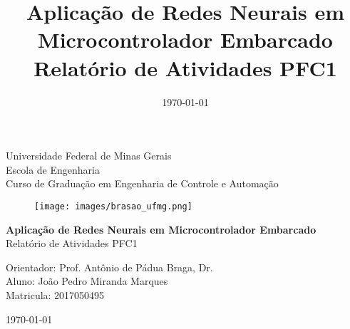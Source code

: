 \begin{titlepage}
    \begin{center}
           
    {\large Universidade Federal de Minas Gerais\\
    Escola de Engenharia \\
    Curso de Graduação em Engenharia de Controle e Automação\\}
    \vfill

    \begin{figure}[h]
        \centering
        \texttt{[image: images/brasao\_ufmg.png]}
    \end{figure}
    \vspace{4cm}


    {\bf\Large Aplicação de Redes Neurais em Microcontrolador Embarcado\\}
    \vspace{1cm} 
    {\Large Relatório de Atividades PFC1}
    \vspace{2cm}  
    
    \vspace{2cm}          
    {\large Orientador: Prof. Antônio de Pádua Braga, Dr.}\\

    
    {\large Aluno: João Pedro Miranda Marques \\
    Matricula: 2017050495}
    \vspace{2cm}  

    \today
    \vspace{2cm}  
       

    \large \date{\today}
    \end{center}
    
    \end{titlepage}
    
    \newpage
    \clearpage
    \thispagestyle{empty}
    
    \cleardoublepage


\title{
    Aplicação de Redes Neurais em Microcontrolador Embarcado \\
    \large Relatório de Atividades PFC1}

